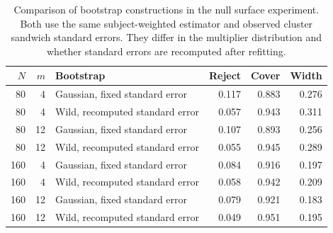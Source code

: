 \begin{table}[htbp]
\centering
\caption{Comparison of bootstrap constructions in the null surface experiment. Both use the same subject-weighted estimator and observed cluster sandwich standard errors. They differ in the multiplier distribution and whether standard errors are recomputed after refitting.}\label{tab:studentization}
\small
\begin{tabular}{rrlrrr}
\toprule
$N$ & $m$ & Bootstrap & Reject & Cover & Width \\
\midrule
80 & 4 & Gaussian, fixed standard error & 0.117 & 0.883 & 0.276 \\
80 & 4 & Wild, recomputed standard error & 0.057 & 0.943 & 0.311 \\
80 & 12 & Gaussian, fixed standard error & 0.107 & 0.893 & 0.256 \\
80 & 12 & Wild, recomputed standard error & 0.055 & 0.945 & 0.289 \\
160 & 4 & Gaussian, fixed standard error & 0.084 & 0.916 & 0.197 \\
160 & 4 & Wild, recomputed standard error & 0.058 & 0.942 & 0.209 \\
160 & 12 & Gaussian, fixed standard error & 0.079 & 0.921 & 0.183 \\
160 & 12 & Wild, recomputed standard error & 0.049 & 0.951 & 0.195 \\
\bottomrule
\end{tabular}
\end{table}
